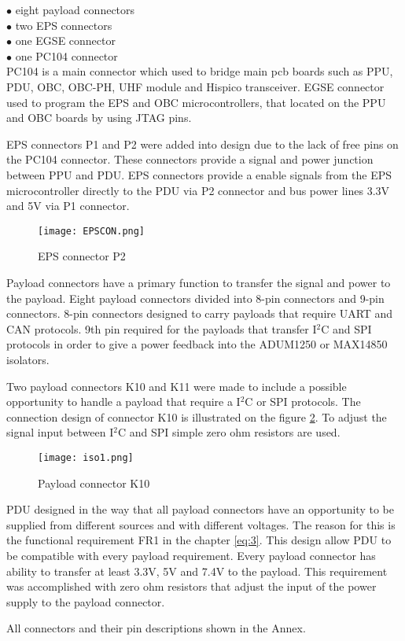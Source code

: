 $\bullet$ eight payload connectors\\
$\bullet$ two EPS connectors\\
$\bullet$ one EGSE connector\\
$\bullet$ one PC104 connector\\

PC104 is a main connector which used to bridge main pcb boards such as PPU, PDU, OBC, OBC-PH, UHF module and Hispico transceiver.
EGSE connector used to program the EPS and OBC microcontrollers, that located on the PPU and OBC boards by using JTAG pins.

EPS connectors P1 and P2 were added into design due to the lack of free pins on the PC104 connector. These connectors provide a signal and power junction between PPU and PDU. EPS connectors provide a enable signals from the EPS microcontroller directly to the PDU via P2 connector and bus power lines 3.3V and 5V via P1 connector.

  \begin{figure}[h]
  	\centering
  	\texttt{[image: EPSCON.png]}
  	\caption{EPS connector P2}
  	\label{fig: EPSCON}
  \end{figure} 

Payload connectors have a primary function to transfer the signal and power to the payload. Eight payload connectors divided into 8-pin connectors and 9-pin connectors. 8-pin connectors designed to carry payloads that require UART and CAN protocols. 9th pin required for the payloads that transfer I$^2$C and SPI protocols in order to give a power feedback into the ADUM1250 or MAX14850 isolators.  

Two payload connectors K10 and K11 were made to include a possible opportunity to handle a payload that require a I$^2$C or SPI protocols.
The connection design of connector K10 is illustrated on the figure \ref{fig: iso1}. To adjust the signal input between I$^2$C and SPI simple zero ohm resistors are used.

\begin{figure}[h]
	\centering
	\texttt{[image: iso1.png]}
	\caption{Payload connector K10}
	\label{fig: iso1}
\end{figure} 
 
PDU designed in the way that all payload connectors have an opportunity to be supplied from different sources and with different voltages. The reason for this is the functional requirement FR1 in the chapter \ref{eq:3}. This design allow PDU to be compatible with every payload requirement. Every payload connector has ability to transfer at least 3.3V, 5V and 7.4V to the payload. This requirement was accomplished with zero ohm  resistors that adjust the input of the power supply to the payload connector.

All connectors and their pin descriptions shown in the Annex. 

 
  
  